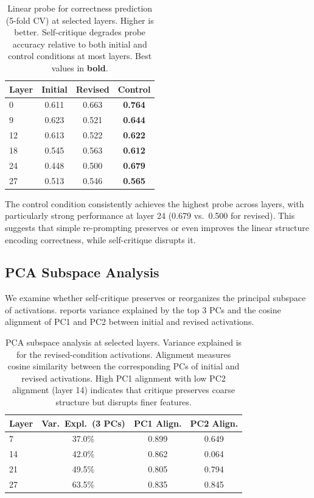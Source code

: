 \begin{table}[t]
    \centering
    \caption{Linear probe \auc for correctness prediction (5-fold CV) at selected layers. Higher is better. Self-critique degrades probe accuracy relative to both initial and control conditions at most layers. Best values in \textbf{bold}.}
    \begin{tabular}{@{}lccc@{}}
        \toprule
        \textbf{Layer} & \textbf{Initial} & \textbf{Revised} & \textbf{Control} \\
        \midrule
        0 & 0.611 & 0.663 & \textbf{0.764} \\
        9 & 0.623 & 0.521 & \textbf{0.644} \\
        12 & 0.613 & 0.522 & \textbf{0.622} \\
        18 & 0.545 & 0.563 & \textbf{0.612} \\
        24 & 0.448 & 0.500 & \textbf{0.679} \\
        27 & 0.513 & 0.546 & \textbf{0.565} \\
        \bottomrule
    \end{tabular}
    \label{tab:probes}
\end{table}

The control condition consistently achieves the highest probe \auc across layers, with particularly strong performance at layer 24 (0.679 vs.\ 0.500 for revised). This suggests that simple re-prompting preserves or even improves the linear structure encoding correctness, while self-critique disrupts it.

\subsection{PCA Subspace Analysis}
\label{sec:results:pca}

We examine whether self-critique preserves or reorganizes the principal subspace of activations.  reports variance explained by the top 3 PCs and the cosine alignment of PC1 and PC2 between initial and revised activations.

\begin{table}[t]
    \centering
    \caption{PCA subspace analysis at selected layers. Variance explained is for the revised-condition activations. Alignment measures cosine similarity between the corresponding PCs of initial and revised activations. High PC1 alignment with low PC2 alignment (layer 14) indicates that critique preserves coarse structure but disrupts finer features.}
    \begin{tabular}{@{}lccc@{}}
        \toprule
        \textbf{Layer} & \textbf{Var.\ Expl.\ (3 PCs)} & \textbf{PC1 Align.} & \textbf{PC2 Align.} \\
        \midrule
        7 & 37.0\% & 0.899 & 0.649 \\
        14 & 42.0\% & 0.862 & 0.064 \\
        21 & 49.5\% & 0.805 & 0.794 \\
        27 & 63.5\% & 0.835 & 0.845 \\
        \bottomrule
    \end{tabular}
    \label{tab:pca}
\end{table}

